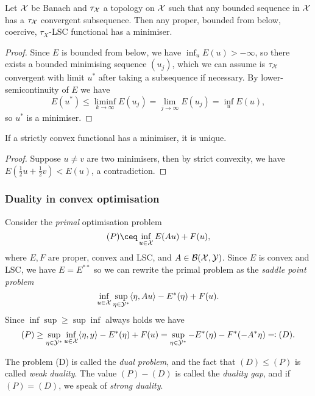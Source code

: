 \begin{theorem} \label{thm:direct_method}
	Let $\mathcal X$ be Banach and $\tau_\mathcal X$ a topology on $\mathcal X$ such that any bounded sequence in $\mathcal X$ has a $\tau_\mathcal X$ convergent subsequence. Then any proper, bounded from below, coercive, $\tau_X$-LSC functional has a minimiser.  
\end{theorem}

\begin{proof}
	Since $E$ is bounded from below, we have $\inf_u E(u) > -\infty$, so there exists a bounded minimising sequence $(u_j)$, which we can assume is $\tau_\mathcal X$ convergent with limit $u^*$ after taking a subsequence if necessary. By lower-semicontinuity of $E$ we have
	\[
	E(u^*) \leq \liminf_{k\to\infty} E(u_j) = \lim_{j\to\infty} E(u_j) = \inf_u E(u),
	\]
	so $u^*$ is a minimiser. 
\end{proof}

\begin{theorem}
	If a strictly convex functional has a minimiser, it is unique. 
\end{theorem}

\begin{proof}
	Suppose $u \neq v$ are two minimisers, then by strict convexity, we have $E(\frac12 u + \frac12 v) < E(u)$, a contradiction. 
\end{proof}

\subsubsection{Duality in convex optimisation}
Consider the \emph{primal} optimisation problem 
\[
(P) \ceq \inf_{u \in \XX} E(Au) + F(u),
\]
where $E, F$ are proper, convex and LSC, and $A \in \mathcal B(\mathcal X, \mathcal Y)$. Since $E$ is convex and LSC, we have $E = E^{**}$ so we can rewrite the primal problem as the \emph{saddle point problem}
\[
\inf_{u \in \mathcal X} \sup_{\eta \in \mathcal Y^*} \langle\eta, Au\rangle - E^*(\eta) + F(u).
\]
Since $\inf\sup \geq \sup\inf$ always holds we have
\[
(P) \geq \sup_{\eta \in \mathcal Y^*} \inf_{u \in \mathcal X} \langle\eta, y\rangle - E^*(\eta) + F(u) = \sup_{\eta \in \mathcal Y^*} -E^*(\eta) - F^*(-A^*\eta) \eqqcolon (D). 
\] 

The problem (D) is called the \emph{dual problem}, and the fact that $(D) \leq (P)$ is called \emph{weak duality}. The value $(P) - (D)$ is called the \emph{duality gap}, and if $(P) = (D)$, we speak of \emph{strong duality}. 

